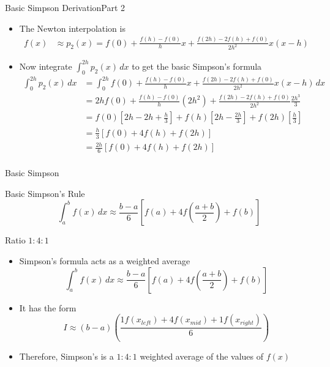 \documentclass[10pt]{beamer}
\begin{document}
\begin{frame}[shrink]{Basic Simpson Derivation}{Part 2}
  \begin{itemize}
  \item The Newton interpolation is 
    \begin{align*}
      f(x) & \approx p_2(x) = f(0) + \frac{f(h)-f(0)}{h} x + \frac{f(2h)-2f(h)+f(0)}{2h^2} x (x-h)
    \end{align*}
  \item Now integrate $\int_{0}^{2h} p_2(x)\,dx$ to get the basic Simpson's formula
  \begin{align*}
  \int_{0}^{2h} p_2(x) \,dx &=  \int_{0}^{2h} f(0) + \frac{f(h)-f(0)}{h} x + \frac{f(2h)-2f(h)+f(0)}{2h^2} x (x-h)\,dx\\
                            &= 2h f(0) + \frac{f(h)-f(0)}{h} (2h^2) + \frac{f(2h)-2f(h)+f(0)}{2h^2} \frac{2h^3}{3} \\
                            &= f(0)\left[ 2h - 2h +\frac{h}{3}\right] + f(h)\left[ 2h -\frac{2h}{3} \right]+f(2h)\left[\frac{h}{3}\right]\\
                         &= \frac{h}{3}\left[f(0) + 4f(h) + f(2h)\right]\\
                         &= \frac{2h}{6}\left[f(0) + 4f(h) + f(2h)\right]\\
  \end{align*}
\end{itemize}
\end{frame}
\begin{frame}{Basic Simpson}
\begin{block}{Basic Simpson's Rule}
  \begin{equation*}
  \int_{a}^{b} f(x)\,dx \approx \frac{b-a}{6}\left[f(a) + 4f\left(\frac{a+b}{2}\right) + f(b)\right]
  \end{equation*}
\end{block}
\begin{center}
\end{center}
\end{frame}

\begin{frame}{Ratio $1:4:1$}

\begin{itemize}
    \item Simpson's formula acts as a weighted average
    \begin{equation*}
  \int_{a}^{b} f(x)\,dx \approx \frac{b-a}{6}\left[f(a) + 4f\left(\frac{a+b}{2}\right) + f(b)\right]
  \end{equation*}

  \item It has the form
  $$
    I \approx (b-a) \left(\frac{1f(x_{left})+4f(x_{mid})+1f(x_{right})}{6}\right)
  $$

  \item Therefore, Simpson's is a $1:4:1$ weighted average of the values of $f(x)$
\end{itemize}
    
\end{frame}
\end{document}
